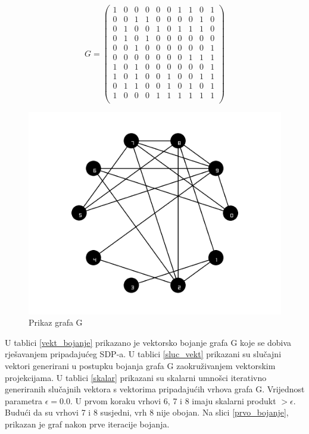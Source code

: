 \documentclass[diplomskirad]{fer}
\begin{document}
\begin{equation} \label{matrica_susjeda}
   G =\begin{pmatrix}
    1 & 0 & 0 & 0 & 0 & 0 & 1 & 1 & 0 & 1 \\
    0 & 0 & 1 & 1 & 0 & 0 & 0 & 0 & 1 & 0 \\
    0 & 1 & 0 & 0 & 1 & 0 & 1 & 1 & 1 & 0 \\
    0 & 1 & 0 & 1 & 0 & 0 & 0 & 0 & 0 & 0 \\
    0 & 0 & 1 & 0 & 0 & 0 & 0 & 0 & 0 & 1 \\
    0 & 0 & 0 & 0 & 0 & 0 & 0 & 1 & 1 & 1 \\
    1 & 0 & 1 & 0 & 0 & 0 & 0 & 0 & 0 & 1 \\
    1 & 0 & 1 & 0 & 0 & 1 & 0 & 0 & 1 & 1 \\
    0 & 1 & 1 & 0 & 0 & 1 & 0 & 1 & 0 & 1 \\
    1 & 0 & 0 & 0 & 1 & 1 & 1 & 1 & 1 & 1 \\
  \end{pmatrix}
\end{equation}

\begin{figure}
  \centering
  \includegraphics[scale=0.4]{images/colors_it2.png}
  \caption{Prikaz grafa G}
  \label{grafG}
\end{figure}

U tablici \ref{vekt_bojanje} prikazano je vektorsko bojanje grafa G koje se dobiva rješavanjem pripadajućeg SDP-a.
U tablici \ref{sluc_vekt} prikazani su slučajni vektori generirani u postupku bojanja grafa G zaokruživanjem vektorskim projekcijama.
U tablici \ref{skalar} prikazani su skalarni umnošci iterativno generiranih slučajnih vektora s vektorima pripadajućih vrhova grafa G.
Vrijednost parametra $\epsilon = 0.0$. U prvom koraku vrhovi 6, 7 i 8 imaju skalarni produkt $>\epsilon$. Budući da su vrhovi 7 i 8 susjedni, 
vrh 8 nije obojan. Na slici \ref{prvo_bojanje}, prikazan je graf nakon prve iteracije bojanja.
\end{document}
